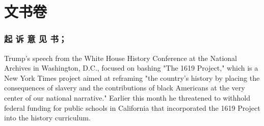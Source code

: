 \part{
    文书卷
}

\section{
    起 诉 意 见 书；
}
Trump's speech from the White House History Conference at the National Archives in Washington, D.C., focused on bashing "The 1619 Project," which is a New York Times project aimed at reframing "the country's history by placing the consequences of slavery and the contributions of black Americans at the very center of our national narrative." Earlier this month he threatened to withhold federal funding for public schools in California that incorporated the 1619 Project into the history curriculum.

